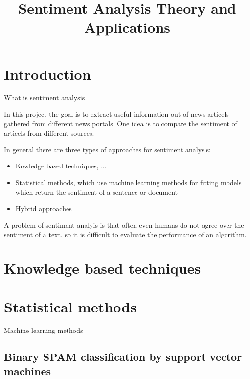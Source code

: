 \documentclass{article}
\title{Sentiment Analysis Theory and Applications}
\begin{document}
\maketitle


\section{Introduction}

What is sentiment analysis


In this project the goal is to extract useful information out of news articels gathered from different news portals. One idea is to compare the sentiment of articels from different sources.

In general there are three types of approaches for sentiment analysis:
\begin{itemize}
  \item Kowledge based techniques, ...
  \item Statistical methods, which use machine learning methods for fitting models which return the sentiment of a sentence or document
  \item Hybrid approaches
\end{itemize}
A problem of sentiment analyis is that often even humans do not agree over the sentiment of a text, so it is difficult to evaluate the performance of an algorithm.

\section{Knowledge based techniques}

\section{Statistical methods}

Machine learning methods

\subsection{Binary SPAM classification by support vector machines}
\end{document}
